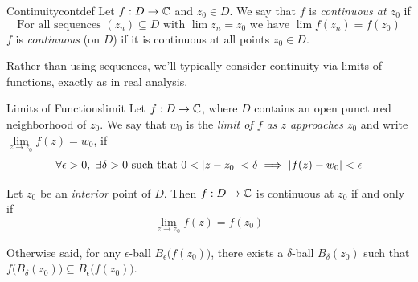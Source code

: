 \goodbreak


\begin{defn}{Continuity}{contdef}
	Let $f:D\to\mathbb{C}$ and $z_0\in D$. We say that $f$ is \emph{continuous at $z_0$} if
	\[
		\text{For all sequences } (z_n)\subseteq D\text{ with }\lim z_n=z_0\text{ we have }\lim f(z_n) = f(z_0)
	\]
	$f$ is \emph{continuous} (on $D$) if it is continuous at all points $z_0\in D$.
\end{defn}


Rather than using sequences, we'll typically consider continuity via limits of functions, exactly as in real analysis.

\begin{defn}{Limits of Functions}{limit}
	Let $f:D\to\mathbb{C}$, where $D$ contains an open punctured neighborhood of $z_0$. We say that $w_0$ is the \emph{limit of $f$ as $z$ approaches $z_0$} and write $\lim\limits_{z\to z_0}f(z)=w_0$, if
	\[
		\forall \epsilon>0,\ \exists \delta>0\text{ such that } 0<\left| z-z_0\right|<\delta\implies \left| f(z)-w_0\right|<\epsilon
	\]
\end{defn}

\begin{thm}{}{}
	Let $z_0$ be an \emph{interior} point of $D$. Then $f:D\to\mathbb{C}$ is continuous at $z_0$ if and only if
	\[
		\lim\limits_{z\to z_0}f(z)=f(z_0)
	\]
\end{thm}

Otherwise said, for any $\epsilon$-ball $B_\epsilon\bigl(f(z_0)\bigr)$, there exists a $\delta$-ball $B_\delta(z_0)$ such that $f\bigl(B_\delta(z_0)\bigr)\subseteq B_\epsilon\bigl(f(z_0)\bigr)$.
\medbreak



